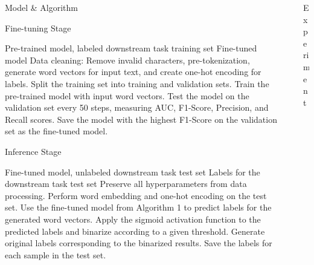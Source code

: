 \documentclass[final]{beamer}
\newlength{\sepwidth}
\newlength{\colwidth}
\newcommand{\separatorcolumn}{\begin{column}{\sepwidth}\end{column}}
\begin{document}
\begin{frame}[t]
\begin{columns}[t]
\begin{column}{\colwidth}
\begin{block}{Model \& Algorithm}
\begin{algorithm}[H]
  \caption{Fine-tuning Stage}
  \label{alg:fine-tuning}
  \begin{algorithmic}[1]
    \REQUIRE Pre-trained model, labeled downstream task training set
    \ENSURE Fine-tuned model
    \STATE Data cleaning: Remove invalid characters, pre-tokenization, generate word vectors for input text, and create one-hot encoding for labels.
    \STATE Split the training set into training and validation sets.
    \STATE Train the pre-trained model with input word vectors. Test the model on the validation set every 50 steps, measuring AUC, F1-Score, Precision, and Recall scores.
    \STATE Save the model with the highest F1-Score on the validation set as the fine-tuned model.
  \end{algorithmic}
\end{algorithm}

\begin{algorithm}[H]
  \caption{Inference Stage}
  \begin{algorithmic}[1]
    \REQUIRE Fine-tuned model, unlabeled downstream task test set
    \ENSURE Labels for the downstream task test set
    \STATE Preserve all hyperparameters from data processing. Perform word embedding and one-hot encoding on the test set.
    \STATE Use the fine-tuned model from Algorithm 1 to predict labels for the generated word vectors.
    \STATE Apply the sigmoid activation function to the predicted labels and binarize according to a given threshold.
    \STATE Generate original labels corresponding to the binarized results.
    \STATE Save the labels for each sample in the test set.
  
  \end{algorithmic}
\end{algorithm}

   

  \end{block}




\end{column}

\separatorcolumn

\begin{column}{\colwidth}

  \begin{block}{Experiment}



\end{block}
\end{column}
\end{columns}
\end{frame}
\end{document}
